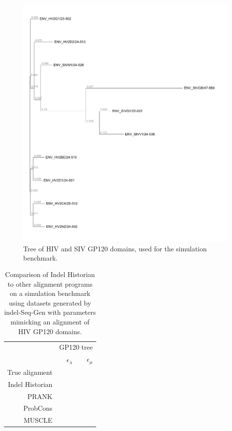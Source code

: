 \documentclass{bioinfo}
\begin{document}
\begin{figure}
  \includegraphics[width=\columnwidth]{gp120tree.pdf}
  \caption{
    Tree of HIV and SIV GP120 domains, used for the simulation benchmark.
  }
\end{figure}

\begin{table}
  \begin{tabular}{r|rr}
    & \multicolumn{2}{c}{GP120 tree} \\
    & $\epsilon_\lambda$ & $\epsilon_\mu$ \\
    \hline
True alignment & \\
Indel Historian & \\
PRANK & \\
ProbCons & \\
MUSCLE & \\
  \end{tabular}
  \caption{
    Comparison of Indel Historian to other alignment programs on a simulation benchmark
    using datasets generated by indel-Seq-Gen \citep{StropeEtAl2009}
    with parameters mimicking an alignment of HIV GP120 domains.
  }
\end{table}
\end{document}
